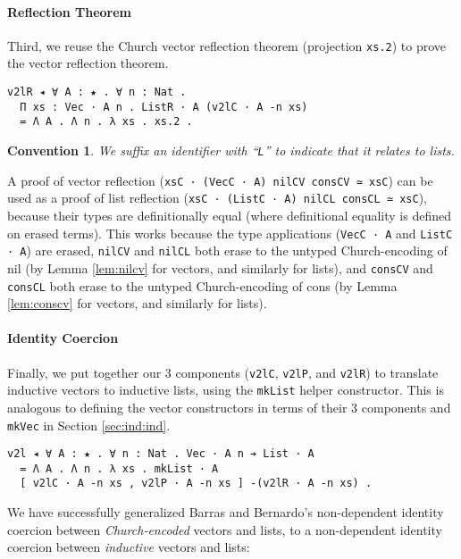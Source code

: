 \documentclass[a4paper,envcountsame,envcountsect]{llncs}
\newtheorem{convention}{Convention}
\newcommand{\refsec}[1]{Section \ref{sec:#1}}
\newcommand{\reflem}[1]{Lemma \ref{lem:#1}}
\begin{document}
\paragraph{Reflection Theorem}

Third, we reuse the Church vector reflection theorem
(projection \texttt{xs.2}) to prove the vector  reflection theorem.

\begin{verbatim}
v2lR ◂ ∀ A : ★ . ∀ n : Nat .
  Π xs : Vec · A n . ListR · A (v2lC · A -n xs)
  = Λ A . Λ n . λ xs . xs.2 .
\end{verbatim}

\begin{convention}
We suffix an identifier with ``\texttt{L}''
to indicate that it relates to lists.
\end{convention}

A proof of vector reflection
(\texttt{xsC · (VecC · A) nilCV consCV ≃ xsC}) can be used as a proof
of list reflection
(\texttt{xsC · (ListC · A) nilCL consCL ≃ xsC}),
because their types are definitionally equal (where definitional
equality is defined on erased terms). This works because the type
applications (\texttt{VecC · A} and \texttt{ListC · A}) are erased,
\texttt{nilCV} and \texttt{nilCL} both erase to
the untyped Church-encoding of nil
(by \reflem{nilcv} for vectors, and similarly for lists), and
\texttt{consCV} and \texttt{consCL} both erase to
the untyped Church-encoding of cons
(by \reflem{conscv} for vectors, and similarly for lists).


\paragraph{Identity Coercion}

Finally, we put together our 3 components
(\texttt{v2lC}, \texttt{v2lP}, and \texttt{v2lR}) to translate
inductive vectors to inductive lists, using the
\texttt{mkList} helper constructor. This is analogous to defining the
vector constructors in terms of their 3 components and \texttt{mkVec}
in \refsec{ind:ind}.

\begin{verbatim}
v2l ◂ ∀ A : ★ . ∀ n : Nat . Vec · A n ➔ List · A
  = Λ A . Λ n . λ xs . mkList · A
  [ v2lC · A -n xs , v2lP · A -n xs ] -(v2lR · A -n xs) .
\end{verbatim}

We have successfully generalized Barras and Bernardo's non-dependent
identity coercion between \textit{Church-encoded} vectors and lists, to a
non-dependent identity coercion between \textit{inductive} vectors and lists:
\end{document}
